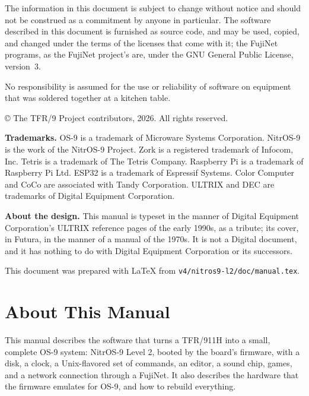 \documentclass[10pt,twoside,openany]{book}
\newcommand{\file}[1]{\texttt{#1}}           %
\newcommand{\thesectname}{}
\begin{document}
{The information in this document is subject to change without notice and
should not be construed as a commitment by anyone in particular. The
software described in this document is furnished as source code, and may
be used, copied, and changed under the terms of the licenses that come
with it; the FujiNet programs, as the FujiNet project's are, under the GNU
General Public License, version~3.

No responsibility is assumed for the use or reliability of software on
equipment that was soldered together at a kitchen table.

\copyright{} The TFR/9 Project contributors, 2026. All rights reserved.

\medskip
\textbf{Trademarks.} OS-9 is a trademark of Microware Systems Corporation.
NitrOS-9 is the work of the NitrOS-9 Project. Zork is a registered
trademark of Infocom, Inc. Tetris is a trademark of The Tetris Company.
Raspberry Pi is a trademark of Raspberry Pi Ltd. ESP32 is a trademark of
Espressif Systems. Color Computer and
CoCo are associated with Tandy Corporation. ULTRIX and DEC are
trademarks of Digital Equipment Corporation.

\medskip
\textbf{About the design.} This manual is typeset in the manner of
Digital Equipment Corporation's ULTRIX reference pages of the early 1990s,
as a tribute; its cover, in Futura, in the manner of a manual of the
1970s. It is not a Digital document, and it has nothing to do with
Digital Equipment Corporation or its successors.

\medskip
This document was prepared with \LaTeX{} from
\file{v4/nitros9-l2/doc/manual.tex}.
}
\clearpage

\pagestyle{fancy}
\renewcommand{\thesectname}{Contents}
\setcounter{page}{3}
\tableofcontents

\chapter*{About This Manual}
\renewcommand{\thesectname}{About This Manual}

This manual describes the software that turns a TFR/911H into a small,
complete OS-9 system: NitrOS-9 Level 2, booted by the board's firmware,
with a disk, a clock, a Unix-flavored set of commands, an editor, a sound
chip, games, and a network connection through a FujiNet. It also describes the hardware that the firmware
emulates for OS-9, and how to rebuild everything.
\end{document}
